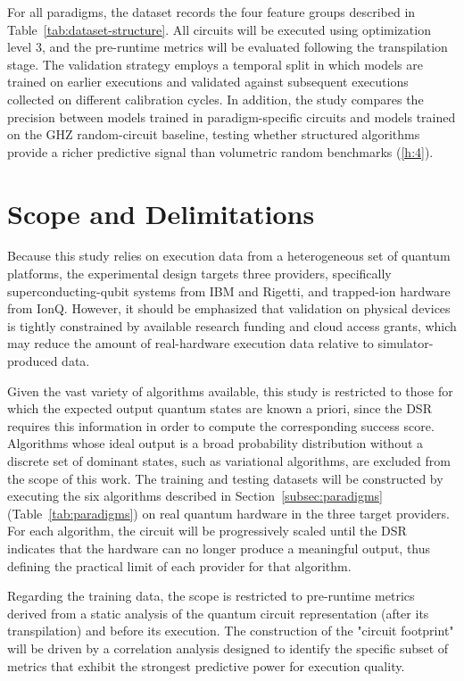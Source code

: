 \documentclass{article}
\begin{document}
For all paradigms, the dataset records the four feature groups described in Table~\ref{tab:dataset-structure}. All circuits will be executed using optimization level 3, and the pre-runtime metrics will be evaluated following the transpilation stage. The validation strategy employs a temporal split in which models are trained on earlier executions and validated against subsequent executions collected on different calibration cycles. In addition, the study compares the precision between models trained in paradigm-specific circuits and models trained on the GHZ random-circuit baseline, testing whether structured algorithms provide a richer predictive signal than volumetric random benchmarks (\ref{h:4}).

\section{Scope and Delimitations}
\label{subsec:scope}

Because this study relies on execution data from a heterogeneous set of quantum platforms, the experimental design targets three providers, specifically superconducting-qubit systems from IBM and Rigetti, and trapped-ion hardware from IonQ. However, it should be emphasized that validation on physical devices is tightly constrained by available research funding and cloud access grants, which may reduce the amount of real-hardware execution data relative to simulator-produced data.

Given the vast variety of algorithms available, this study is restricted to those for which the expected output quantum states are known a priori, since the DSR requires this information in order to compute the corresponding success score. Algorithms whose ideal output is a broad probability distribution without a discrete set of dominant states, such as variational algorithms, are excluded from the scope of this work. The training and testing datasets will be constructed by executing the six algorithms described in Section~\ref{subsec:paradigms} (Table~\ref{tab:paradigms}) on real quantum hardware in the three target providers. For each algorithm, the circuit will be progressively scaled until the DSR indicates that the hardware can no longer produce a meaningful output, thus defining the practical limit of each provider for that algorithm.

Regarding the training data, the scope is restricted to pre-runtime metrics derived from a static analysis of the quantum circuit representation (after its transpilation) and before its execution. The construction of the "circuit footprint" will be driven by a correlation analysis designed to identify the specific subset of metrics that exhibit the strongest predictive power for execution quality.
\end{document}
